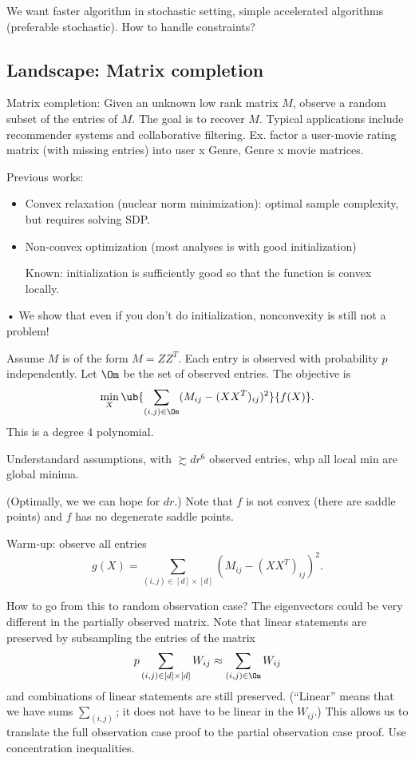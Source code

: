 We want faster algorithm in stochastic setting, simple accelerated algorithms (preferable stochastic). How to handle constraints?


\subsection{Landscape: Matrix completion}

Matrix completion: Given an unknown low rank matrix $M$, observe a random subset of the entries of $M$. The goal is to recover $M$. Typical applications include recommender systems and collaborative filtering. 
Ex. factor a user-movie rating matrix (with missing entries) into user x Genre, Genre x movie matrices.

Previous works:
\begin{itemize}
\item
Convex relaxation (nuclear norm minimization): optimal sample complexity, but requires solving SDP.
\item
Non-convex optimization (most analyses is with good initialization)

Known: initialization is sufficiently good so that the function is convex locally.
\end{itemize}•
We show that even if you don't do initialization, nonconvexity is still not a problem!

Assume $M$ is of the form $M=ZZ^T$. Each entry is observed with probability $p$ independently. Let $\Om$ be the set of observed entries. The objective is
$$
\min_X \ub{\sum_{(i,j)\in \Om} (M_{ij} - (XX^T)_{ij})^2}{f(X)}.
$$
This is a degree 4 polynomial.

\begin{thm}
Understandard assumptions, with $\succsim dr^6$ observed entries, whp all local min are global minima.
\end{thm}
(Optimally, we we can hope for $dr$.)
Note that $f$ is not convex (there are saddle points) and $f$ has no degenerate saddle points.


Warm-up: observe all entries
$$
g(X) =  {\sum_{(i,j)\in [d]\times [d]} (M_{ij} - (XX^T)_{ij})^2}.$$

How to go from this to random observation case? 
The eigenvectors could be very different in the partially observed matrix.
Note that linear statements are preserved by subsampling the entries of the matrix 
$$p\sum_{(i,j)\in [d]\times [d]} W_{ij}\approx \sum_{(i,j)\in \Om} W_{ij}$$
and combinations of linear statements are still preserved. (``Linear'' means that we have sums $\sum_{(i,j)}$; it does not have to be linear in the $W_{ij}$.)
This allows us to translate the full observation case proof to the partial observation case proof. Use concentration inequalities.


